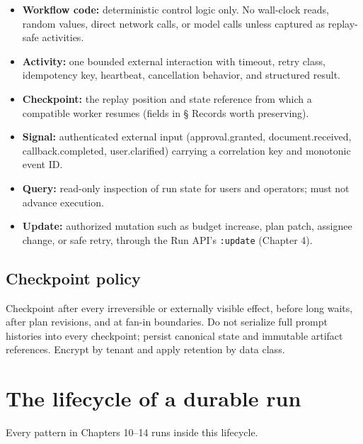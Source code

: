 \begin{itemize}

\item \textbf{Workflow code:} deterministic control logic only. No wall-clock reads, random values, direct network calls, or model calls unless captured as replay-safe activities.

\item \textbf{Activity:} one bounded external interaction with timeout, retry class, idempotency key, heartbeat, cancellation behavior, and structured result.

\item \textbf{Checkpoint:} the replay position and state reference from which a compatible worker resumes (fields in § Records worth preserving).

\item \textbf{Signal:} authenticated external input (approval.granted, document.received, callback.completed, user.clarified) carrying a correlation key and monotonic event ID.

\item \textbf{Query:} read-only inspection of run state for users and operators; must not advance execution.

\item \textbf{Update:} authorized mutation such as budget increase, plan patch, assignee change, or safe retry, through the Run API's \lstinline[style=bookinline]!:update! (Chapter 4).

\end{itemize}

\subsection{Checkpoint policy}

Checkpoint after every irreversible or externally visible effect, before long waits, after plan revisions, and at fan-in boundaries. Do not serialize full prompt histories into every checkpoint; persist canonical state and immutable artifact references. Encrypt by tenant and apply retention by data class.\par

\section{The lifecycle of a durable run}

Every pattern in Chapters 10–14 runs inside this lifecycle.\par

